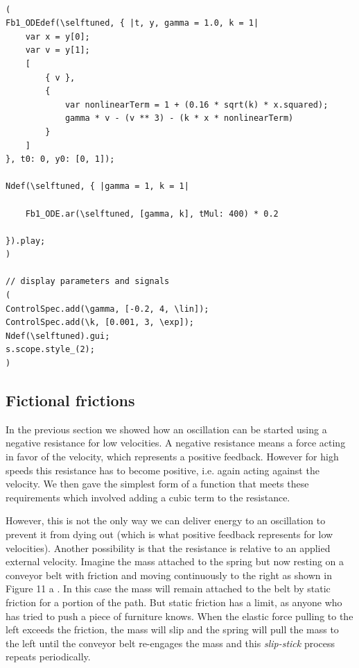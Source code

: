 \documentclass{article}
\begin{document}
\newpage

\begin{lstlisting}[frame=single,caption=Compensated or self-tuned oscillation.]

(
Fb1_ODEdef(\selftuned, { |t, y, gamma = 1.0, k = 1|
	var x = y[0];
	var v = y[1];
	[
		{ v },
		{
			var nonlinearTerm = 1 + (0.16 * sqrt(k) * x.squared);
			gamma * v - (v ** 3) - (k * x * nonlinearTerm)
		}
	]
}, t0: 0, y0: [0, 1]);

Ndef(\selftuned, { |gamma = 1, k = 1|

	Fb1_ODE.ar(\selftuned, [gamma, k], tMul: 400) * 0.2

}).play;
)

// display parameters and signals
(
ControlSpec.add(\gamma, [-0.2, 4, \lin]);
ControlSpec.add(\k, [0.001, 3, \exp]);
Ndef(\selftuned).gui;
s.scope.style_(2);
)

\end{lstlisting}


\subsection{Fictional frictions}

In the previous section we showed how an oscillation can be started using a negative resistance for low velocities. 
A negative resistance means a force acting in favor of the velocity, which represents a positive feedback. 
However for high speeds this resistance has to become positive, i.e. again acting against the velocity. 
We then gave the simplest form of a function that meets these requirements which involved adding a cubic term to the resistance. 

However, this is not the only way we can deliver energy to an oscillation to prevent it from dying out (which is what positive feedback represents for low velocities). 
Another possibility is that the resistance is relative to an applied external velocity. 
Imagine the mass attached to the spring but now resting on a conveyor belt with friction and moving continuously to the right as shown in Figure 11 a . 
In this case the mass will remain attached to the belt by static friction for a portion of the path. 
But static friction has a limit, as anyone who has tried to push a piece of furniture knows. 
When the elastic force pulling to the left exceeds the friction, the mass will slip and the spring will pull the mass to the left until the conveyor belt re-engages the mass and this {\em slip-stick} process repeats periodically. 
\end{document}
